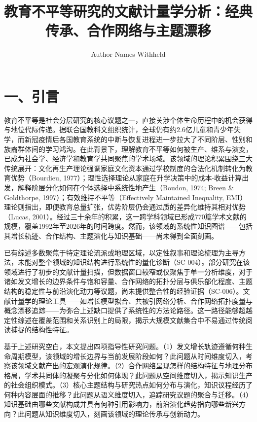 \documentclass[12pt,a4paper]{article}
\title{教育不平等研究的文献计量学分析：经典传承、合作网络与主题漂移}
\author{Author Names Withheld}
\date{}
\begin{document}
\maketitle

\section{一、引言}

教育不平等是社会分层研究的核心议题之一，直接关涉个体生命历程中的机会获得与地位代际传递。据联合国教科文组织统计，全球仍有约2.6亿儿童和青少年失学，而新冠疫情后各国教育系统的中断与恢复进程进一步拉大了不同阶层、性别和族裔群体间的学习鸿沟。在此背景下，理解教育不平等如何被生产、维系与演变，已成为社会学、经济学和教育学共同聚焦的学术场域。该领域的理论积累围绕三大传统展开：文化再生产理论强调家庭文化资本通过学校制度的合法化机制转化为教育优势（Bourdieu, 1977）；理性选择理论从家庭在升学决策中的成本-收益计算出发，解释阶层分化如何在个体选择中系统性地产生（Boudon, 1974; Breen \& Goldthorpe, 1997）；有效维持不平等（Effectively Maintained Inequality, EMI）理论则指出，即便教育总量扩张，优势阶层仍会通过质的差异化维持其相对优势（Lucas, 2001）。经过三十余年的积累，这一跨学科领域已形成770篇学术文献的规模，覆盖1992年至2026年的时间跨度。然而，该领域的系统性知识图谱——包括其增长轨迹、合作结构、主题演化与知识基础——尚未得到全面刻画。

已有综述多数聚焦于特定理论流派或地理区域，以定性叙事和理论梳理为主导方法，未能对整个领域的知识结构进行系统性的量化诊断（SC-004）。部分研究在该领域进行了初步的文献计量扫描，但数据窗口较窄或仅聚焦于单一分析维度，对于诸如发文增长的边界条件与饱和容量、合作网络的拓扑分层与俱乐部化程度、主题结构的稳定性与前沿演化动力等议题，尚未提供整合性的经验证据（SC-006）。文献计量学的理论工具——如增长模型拟合、共被引网络分析、合作网络拓扑度量与概念漂移追踪——为弥合上述缺口提供了系统性的方法论路径。这一路径能够超越定性综述在覆盖范围和关系识别上的局限，揭示大规模文献集合中不易通过传统阅读捕捉的结构性特征。

基于上述研究空白，本文提出四项指导性研究问题。（1）发文增长轨迹遵循何种生命周期模型，该领域的增长边界与当前发展阶段如何？此问题从时间维度切入，考察该领域文献产出的宏观演化规律。（2）合作网络呈现怎样的结构特征与地理分布格局，学术共同体的凝聚与分化如何体现？此问题从空间维度切入，揭示知识生产的社会组织模式。（3）核心主题结构与研究热点如何分布与演化，知识议程经历了何种内容层面的推移？此问题从语义维度切入，追踪研究议题的聚合与迁移。（4）知识基础由哪些文献构成并具有何种引用影响力，前沿演化趋势指向哪些新兴方向？此问题从知识维度切入，刻画该领域的理论传承与创新动力。
\end{document}
